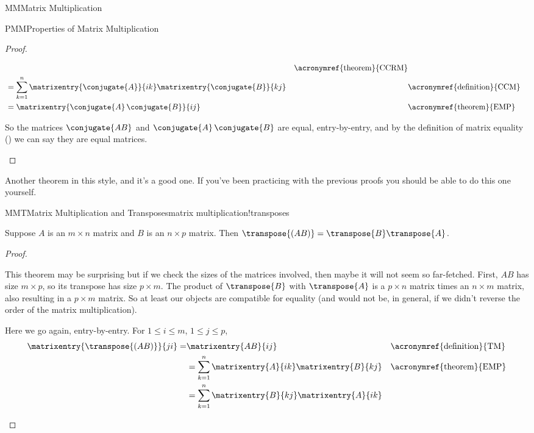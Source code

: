 \begin{subsect}{MM}{Matrix Multiplication}
\begin{subsect}{PMM}{Properties of Matrix Multiplication}
\begin{proof}
\begin{para}
\begin{align*}
&&\text{\acronymref{theorem}{CCRM}}\\
%
&=\sum_{k=1}^{n}\matrixentry{\conjugate{A}}{ik}\matrixentry{\conjugate{B}}{kj}
&&\text{\acronymref{definition}{CCM}}\\
%
&=\matrixentry{\conjugate{A}\,\conjugate{B}}{ij}
&&\text{\acronymref{theorem}{EMP}}
%
\end{align*}
\end{para}
%
\begin{para}So the matrices $\conjugate{AB}$ and $\conjugate{A}\,\conjugate{B}$ are equal, entry-by-entry, and by the definition of matrix equality () we can say they are equal matrices.\end{para}
%
\end{proof}
%
\begin{para}Another theorem in this style, and it's a good one.  If you've been practicing with the previous proofs you should be able to do this one yourself.\end{para}
%
\begin{theorem}{MMT}{Matrix Multiplication and Transposes}{matrix multiplication!transposes}
\begin{para}Suppose $A$ is an $m\times n$ matrix and $B$ is an $n\times p$ matrix.  Then $\transpose{(AB)}=\transpose{B}\transpose{A}$.\end{para}
\end{theorem}
%
\begin{proof}
\begin{para}This theorem may be surprising but if we check the sizes of the matrices involved, then maybe it will not seem so far-fetched.  First, $AB$ has size $m\times p$, so its transpose has size $p\times m$.  The product of $\transpose{B}$ with $\transpose{A}$ is a $p\times n$ matrix times an $n\times m$ matrix, also resulting in a $p\times m$ matrix.  So at least our objects are compatible for equality (and would not be, in general, if we didn't reverse the order of the matrix multiplication).\end{para}
%
\begin{para}Here we go again, entry-by-entry.  For $1\leq i\leq m$, $1\leq j\leq p$,
%
\begin{align*}
\matrixentry{\transpose{(AB)}}{ji}=&\matrixentry{AB}{ij}
&&\text{\acronymref{definition}{TM}}\\
%
&=\sum_{k=1}^{n}\matrixentry{A}{ik}\matrixentry{B}{kj}
&&\text{\acronymref{theorem}{EMP}}\\
%
&=\sum_{k=1}^{n}\matrixentry{B}{kj}\matrixentry{A}{ik}

\end{align*}
\end{para}
\end{proof}
\end{subsect}
\end{subsect}

